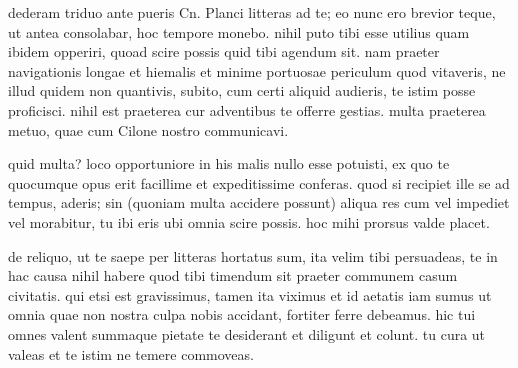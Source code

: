


 dederam triduo ante pueris Cn. Planci litteras ad te; eo nunc ero brevior teque, ut antea consolabar, hoc tempore monebo. nihil puto tibi esse utilius quam ibidem opperiri, quoad scire possis quid tibi agendum sit. nam praeter navigationis longae et hiemalis et minime portuosae periculum quod vitaveris, ne illud quidem non quantivis, subito, cum certi aliquid audieris, te istim posse proficisci. nihil est praeterea cur adventibus te offerre gestias. multa praeterea metuo, quae cum Cilone nostro communicavi.

 quid multa? loco opportuniore in his malis nullo esse potuisti, ex quo te quocumque opus erit facillime et expeditissime conferas. quod si recipiet ille se ad tempus, aderis; sin (quoniam multa accidere possunt) aliqua res cum vel impediet vel morabitur, tu ibi eris ubi omnia scire possis. hoc mihi prorsus valde placet.

 de reliquo, ut te saepe per litteras hortatus sum, ita velim tibi persuadeas, te in hac causa nihil habere quod tibi timendum sit praeter communem casum civitatis. qui etsi est gravissimus, tamen ita viximus et id aetatis iam sumus ut omnia quae non nostra culpa nobis accidant, fortiter ferre debeamus. hic tui omnes valent summaque pietate te desiderant et diligunt et colunt. tu cura ut valeas et te istim ne temere commoveas.
